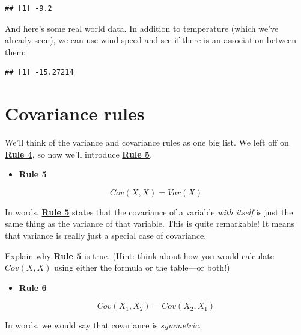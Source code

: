 \documentclass[
]{book}
\newenvironment{Shaded}{\begin{snugshade}}{\end{snugshade}}
\newcommand{\FunctionTok}[1]{\textcolor[rgb]{0.00,0.00,0.00}{#1}}
\newcommand{\NormalTok}[1]{#1}
\newcommand{\SpecialCharTok}[1]{\textcolor[rgb]{0.00,0.00,0.00}{#1}}
\providecommand{\tightlist}{%
  \setlength{\itemsep}{0pt}\setlength{\parskip}{0pt}}
\begin{document}
\begin{verbatim}
## [1] -9.2
\end{verbatim}

And here's some real world data. In addition to temperature (which we've already seen), we can use wind speed and see if there is an association between them:

\begin{Shaded}
\end{Shaded}

\begin{verbatim}
## [1] -15.27214
\end{verbatim}

\hypertarget{covariance-rules}{%
\section{Covariance rules}\label{covariance-rules}}

We'll think of the variance and covariance rules as one big list. We left off on \href{./variance.html\#Rule4}{\textbf{Rule 4}}, so now we'll introduce \protect\hyperlink{Rule5}{\textbf{Rule 5}}.

\begin{itemize}
\tightlist
\item
  \textbf{Rule 5}
\end{itemize}

\[
Cov(X, X) = Var(X)
\]

In words, \protect\hyperlink{Rule5}{\textbf{Rule 5}} states that the covariance of a variable \emph{with itself} is just the same thing as the variance of that variable. This is quite remarkable! It means that variance is really just a special case of covariance.

Explain why \protect\hyperlink{Rule5}{\textbf{Rule 5}} is true. (Hint: think about how you would calculate \(Cov(X, X)\) using either the formula or the table---or both!)

\begin{itemize}
\tightlist
\item
  \textbf{Rule 6}
\end{itemize}

\[
Cov\left(X_{1}, X_{2}\right) = Cov\left(X_{2}, X_{1}\right)
\]

In words, we would say that covariance is \emph{symmetric}.
\end{document}
